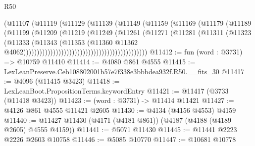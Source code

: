 \begin{lexlean}{R50}
\begin{coremodule}
                                                    (@11107
                                                      (@11119
                                                        (@11129
                                                          (@11139
                                                            (@11149
                                                              (@11159
                                                                (@11169
                                                                  (@11179
                                                                    (@11189
                                                                      (@11199
                                                                        (@11209
                                                                          (@11219
                                                                            (@11249
                                                                              (@11261
                                                                                (@11271
                                                                                  (@11281
                                                                                    (@11311
                                                                                      (@11323
                                                                                        (@11333
                                                                                          (@11343
                                                                                            (@11353
                                                                                              (@11360
                                                                                                @11362
                                                                                                @4062))))))))))))))))))))))))))))))))))))))))))))))
@11412 := fun (word : @3731) => @10759 @11410
@11414 := @4080 @861 @4555
@11415 := LexLeanPreserve.Ceb108802001b57e7f338e3bbbdea932f.R50.__fits_30
@11417 := @4096 (@11415 @3423)
@11418 := LexLeanBoot.PropositionTerms.keywordEntry
@11421 := @11417 (@3733 (@11418 @3423))
@11423 := (word : @3731) -> @11414 @11421
@11427 := @4126 @861 @4555 @11421 @2605
@11430 := @4134 (@4156 @4553) @4159
@11440 := @11427 @11430 (@4171 (@4181 @861)) (@4187 (@4188 (@4189 @2605) @4555 @4159))
@11441 := @5071 @11430
@11445 := @11441 @2223 @2226 @2603 @10758
@11446 := @5085 @10770
@11447 := @10681 @10778

\end{coremodule}
\end{lexlean}

